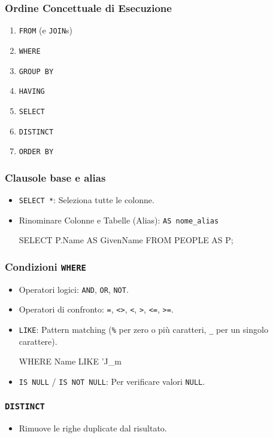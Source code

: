 \documentclass{article}
\begin{document}
	\subsubsection{Ordine Concettuale di Esecuzione}
	\begin{enumerate}
		\item \texttt{FROM} (e \texttt{JOIN}s)
		\item \texttt{WHERE}
		\item \texttt{GROUP BY}
		\item \texttt{HAVING}
		\item \texttt{SELECT}
		\item \texttt{DISTINCT}
		\item \texttt{ORDER BY}
	\end{enumerate}
	
	\subsubsection{Clausole base e alias}
	\begin{itemize}
		\item \texttt{SELECT *}: Seleziona tutte le colonne.
		\item Rinominare Colonne e Tabelle (Alias): \texttt{AS nome\_alias}
		\begin{sqlcode}
			SELECT P.Name AS GivenName FROM PEOPLE AS P;
		\end{sqlcode}
	\end{itemize}
	
	\subsubsection{Condizioni \texttt{WHERE}}
	\begin{itemize}
		\item Operatori logici: \texttt{AND}, \texttt{OR}, \texttt{NOT}.
		\item Operatori di confronto: \texttt{=}, \texttt{<>}, \texttt{<}, \texttt{>}, \texttt{<=}, \texttt{>=}.
		\item \texttt{LIKE}: Pattern matching (\texttt{\%} per zero o più caratteri, \texttt{\_} per un singolo carattere).
		\begin{sqlcode}
			WHERE Name LIKE 'J_m%
		\end{sqlcode}
		\item \texttt{IS NULL} / \texttt{IS NOT NULL}: Per verificare valori \texttt{NULL}.
	\end{itemize}
	
	\subsubsection{\texttt{DISTINCT}}
	\begin{itemize}
		\item Rimuove le righe duplicate dal risultato.
	\end{itemize}
	
\end{document}

